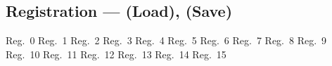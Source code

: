 \subsection[Registration]{Registration --- \UiKey{\REG} (Load), \UiKey{\I}\UiKey{\REG} (Save)}
Reg.\ 0
Reg.\ 1
Reg.\ 2
Reg.\ 3
Reg.\ 4
Reg.\ 5
Reg.\ 6
Reg.\ 7
Reg.\ 8
Reg.\ 9
Reg.\ 10
Reg.\ 11
Reg.\ 12
Reg.\ 13
Reg.\ 14
Reg.\ 15
